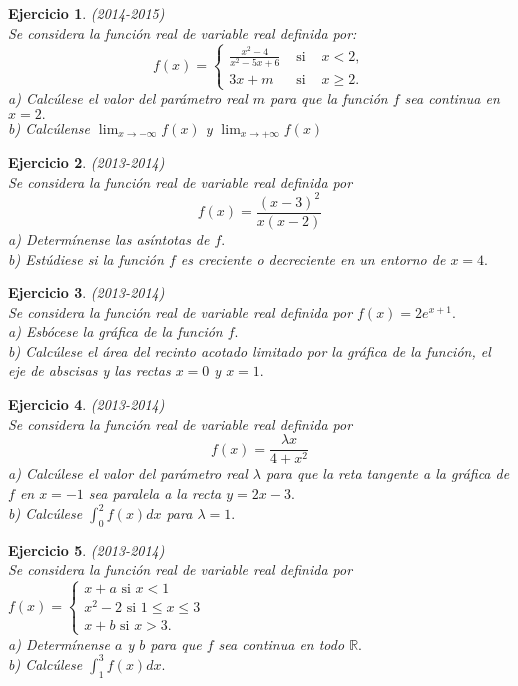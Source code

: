 \documentclass[12pt, a4paper]{amsart}
\newtheorem{ejer}{Ejercicio}
\begin{document}
\begin{ejer}\em (2014-2015)\\
Se considera la función real de variable real definida por:
\[f(x)=\left \{ \begin{matrix}
\frac{x^2-4}{x^2-5x+6} & \text{ si } & x<2,\\
3x+m & \text{ si } & x\geq 2.
\end{matrix}\right.\]
a) Calcúlese el valor del parámetro real $m$ para que la función $f$ sea continua en $x = 2.$\\
b) Calcúlense $\lim_{x\to -\infty}f(x)$ y $\lim_{x\to +\infty}f(x)$
\end{ejer}

\begin{ejer}\em (2013-2014)\\
Se considera la función real de variable real definida por
\[f(x)=\frac{(x-3)^2}{x(x-2)}\]
a) Determínense las asíntotas de $f.$\\
b) Estúdiese si la función $f$ es creciente o decreciente en un entorno de $x=4.$
\end{ejer}

\begin{ejer}\em (2013-2014)\\
Se considera la función real de variable real definida por $f(x)=2e^{x+1}.$\\
a) Esbócese la gráfica de la función $f.$\\
b) Calcúlese el área del recinto acotado limitado por la gráfica de la función, el eje de abscisas y las rectas $x=0$ y $x=1.$
\end{ejer}

\begin{ejer}\em (2013-2014)\\
Se considera la función real de variable real definida por
\[f(x)=\frac{\lambda x}{4+x^2}\]
a) Calcúlese el valor del parámetro real $\lambda$ para que la reta tangente a la gráfica de $f$ en $x=-1$ sea paralela a la recta $y=2x-3.$\\
b) Calcúlese $\int_0^2f(x)dx$ para $\lambda=1.$
\end{ejer}

\begin{ejer}\em  (2013-2014)\\
Se considera la función real de variable real definida por $f(x)=\left \{ \begin{matrix}
x+a \text{ si } x<1\\
x^2-2\text{ si } 1\leq x\leq 3\\
x+b \text{ si } x>3.
\end{matrix}\right.
$\\
a) Determínense $a$ y $b$ para que $f$ sea continua en todo $\mathbb{R}.$\\
b) Calcúlese $\int_1^3 f(x)dx.$
\end{ejer}
\end{document}
